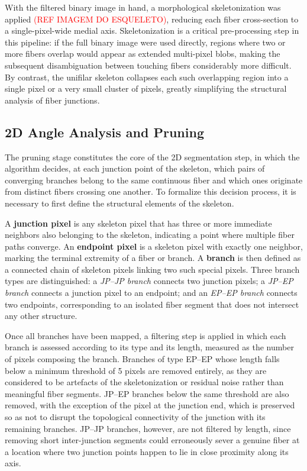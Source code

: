 With the filtered binary image in hand, a morphological skeletonization was applied \textcolor{red}{(REF IMAGEM DO ESQUELETO)}, reducing each fiber cross-section to a single-pixel-wide medial axis. Skeletonization is a critical pre-processing step in this pipeline: if the full binary image were used directly, regions where two or more fibers overlap would appear as extended multi-pixel blobs, making the subsequent disambiguation between touching fibers considerably more difficult. By contrast, the unifilar skeleton collapses each such overlapping region into a single pixel or a very small cluster of pixels, greatly simplifying the structural analysis of fiber junctions.

\subsection{2D Angle Analysis and Pruning}

The pruning stage constitutes the core of the 2D segmentation step, in which the algorithm decides, at each junction point of the skeleton, which pairs of converging branches belong to the same continuous fiber and which ones originate from distinct fibers crossing one another. To formalize this decision process, it is necessary to first define the structural elements of the skeleton.

A \textbf{junction pixel} is any skeleton pixel that has three or more immediate neighbors also belonging to the skeleton, indicating a point where multiple fiber paths converge. An \textbf{endpoint pixel} is a skeleton pixel with exactly one neighbor, marking the terminal extremity of a fiber or branch. A \textbf{branch} is then defined as a connected chain of skeleton pixels linking two such special pixels. Three branch types are distinguished: a \textit{JP--JP branch} connects two junction pixels; a \textit{JP--EP branch} connects a junction pixel to an endpoint; and an \textit{EP--EP branch} connects two endpoints, corresponding to an isolated fiber segment that does not intersect any other structure.

Once all branches have been mapped, a filtering step is applied in which each branch is assessed according to its type and its length, measured as the number of pixels composing the branch. Branches of type EP--EP whose length falls below a minimum threshold of 5 pixels are removed entirely, as they are considered to be artefacts of the skeletonization or residual noise rather than meaningful fiber segments. JP--EP branches below the same threshold are also removed, with the exception of the pixel at the junction end, which is preserved so as not to disrupt the topological connectivity of the junction with its remaining branches. JP--JP branches, however, are not filtered by length, since removing short inter-junction segments could erroneously sever a genuine fiber at a location where two junction points happen to lie in close proximity along its axis.


